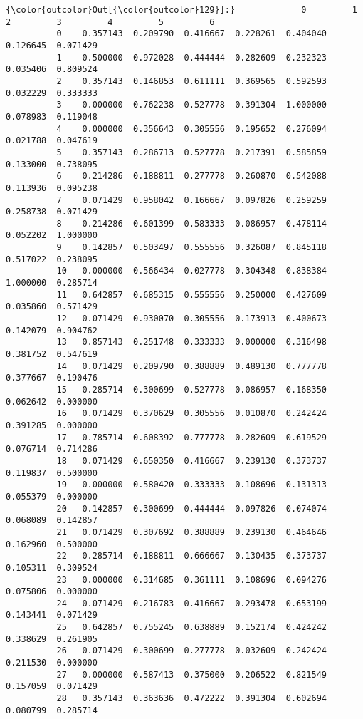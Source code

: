 \documentclass[11pt]{article}
\begin{document}
\begin{Verbatim}[commandchars=\\\{\}]
{\color{outcolor}Out[{\color{outcolor}129}]:}             0         1         2         3         4         5         6
          0    0.357143  0.209790  0.416667  0.228261  0.404040  0.126645  0.071429
          1    0.500000  0.972028  0.444444  0.282609  0.232323  0.035406  0.809524
          2    0.357143  0.146853  0.611111  0.369565  0.592593  0.032229  0.333333
          3    0.000000  0.762238  0.527778  0.391304  1.000000  0.078983  0.119048
          4    0.000000  0.356643  0.305556  0.195652  0.276094  0.021788  0.047619
          5    0.357143  0.286713  0.527778  0.217391  0.585859  0.133000  0.738095
          6    0.214286  0.188811  0.277778  0.260870  0.542088  0.113936  0.095238
          7    0.071429  0.958042  0.166667  0.097826  0.259259  0.258738  0.071429
          8    0.214286  0.601399  0.583333  0.086957  0.478114  0.052202  1.000000
          9    0.142857  0.503497  0.555556  0.326087  0.845118  0.517022  0.238095
          10   0.000000  0.566434  0.027778  0.304348  0.838384  1.000000  0.285714
          11   0.642857  0.685315  0.555556  0.250000  0.427609  0.035860  0.571429
          12   0.071429  0.930070  0.305556  0.173913  0.400673  0.142079  0.904762
          13   0.857143  0.251748  0.333333  0.000000  0.316498  0.381752  0.547619
          14   0.071429  0.209790  0.388889  0.489130  0.777778  0.377667  0.190476
          15   0.285714  0.300699  0.527778  0.086957  0.168350  0.062642  0.000000
          16   0.071429  0.370629  0.305556  0.010870  0.242424  0.391285  0.000000
          17   0.785714  0.608392  0.777778  0.282609  0.619529  0.076714  0.714286
          18   0.071429  0.650350  0.416667  0.239130  0.373737  0.119837  0.500000
          19   0.000000  0.580420  0.333333  0.108696  0.131313  0.055379  0.000000
          20   0.142857  0.300699  0.444444  0.097826  0.074074  0.068089  0.142857
          21   0.071429  0.307692  0.388889  0.239130  0.464646  0.162960  0.500000
          22   0.285714  0.188811  0.666667  0.130435  0.373737  0.105311  0.309524
          23   0.000000  0.314685  0.361111  0.108696  0.094276  0.075806  0.000000
          24   0.071429  0.216783  0.416667  0.293478  0.653199  0.143441  0.071429
          25   0.642857  0.755245  0.638889  0.152174  0.424242  0.338629  0.261905
          26   0.071429  0.300699  0.277778  0.032609  0.242424  0.211530  0.000000
          27   0.000000  0.587413  0.375000  0.206522  0.821549  0.157059  0.071429
          28   0.357143  0.363636  0.472222  0.391304  0.602694  0.080799  0.285714

\end{Verbatim}
\end{document}

